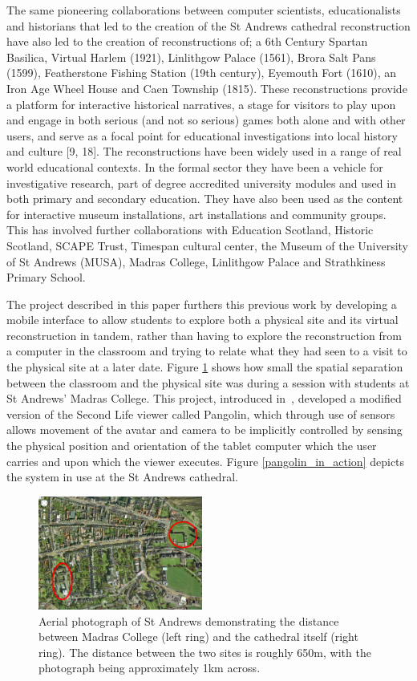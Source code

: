 The same pioneering collaborations between computer scientists, educationalists and historians that led to the creation of the St Andrews cathedral reconstruction have also led to the creation of reconstructions of; a 6th Century Spartan Basilica, Virtual Harlem (1921), Linlithgow Palace (1561), Brora Salt Pans (1599), Featherstone Fishing Station (19th century), Eyemouth Fort (1610), an Iron Age Wheel House and Caen Township (1815). These reconstructions provide a platform for interactive historical narratives, a stage for visitors to play upon and engage in both serious (and not so serious) games both alone and with other users, and serve as a focal point for educational investigations into local history and culture [9, 18]. The reconstructions have been widely used in a range of real world educational contexts. In the formal sector they have been a vehicle for investigative research, part of degree accredited university modules and used in both primary and secondary education. They have also been used as the content for interactive museum installations, art installations and community groups. This has involved further collaborations with Education Scotland, Historic Scotland, SCAPE Trust, Timespan cultural center, the Museum of the University of St Andrews (MUSA), Madras College, Linlithgow Palace and Strathkiness Primary School.

The project described in this paper furthers this previous work by developing a mobile interface to allow students to explore both a physical site and its virtual reconstruction in tandem, rather than having to explore the reconstruction from a computer in the classroom and trying to relate what they had seen to a visit to the physical site at a later date. Figure \ref{separation_map} shows how small the spatial separation between the classroom and the physical site was during a session with students at St Andrews' Madras College. This project, introduced in~\cite{Davies2012}, developed a modified version of the Second Life viewer called Pangolin, which through use of sensors allows movement of the avatar and camera to be implicitly controlled by sensing the physical position and orientation of the tablet computer which the user carries and upon which the viewer executes. Figure \ref{pangolin_in_action} depicts the system in use at the St Andrews cathedral.

\begin{figure}[h]
\centering
\includegraphics[width=0.48\textwidth]{images/separation_map}
\caption{Aerial photograph of St Andrews demonstrating the distance between Madras College (left ring) and the cathedral itself (right ring). The distance between the two sites is roughly 650m, with the photograph being approximately 1km across.}
\label{separation_map}
\end{figure}

